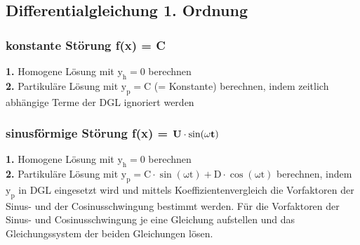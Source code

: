     \subsection{Differentialgleichung 1. Ordnung}
        \subsubsection{konstante Störung f(x) = C}
            \textbf{1.} Homogene Lösung mit $\mathrm{y_h = 0}$ berechnen\\
            \textbf{2.} Partikuläre Lösung mit $\mathrm{y_p = C}$ (= Konstante) berechnen, indem zeitlich abhängige Terme der DGL ignoriert werden
        \subsubsection{sinusförmige Störung f(x) = $\mathrm{\bf U \cdot \sin(\omega t)}$}
            \textbf{1.} Homogene Lösung mit $\mathrm{y_h = 0}$ berechnen\\
            \textbf{2.} Partikuläre Lösung mit $\mathrm{y_p = C \cdot \sin(\omega t) + D\cdot \cos(\omega t)}$ berechnen, indem $\mathrm{y_p}$ in DGL eingesetzt wird und mittels Koeffizientenvergleich die Vorfaktoren der Sinus- und der Cosinusschwingung bestimmt werden. Für die Vorfaktoren der Sinus- und Cosinusschwingung je eine Gleichung aufstellen und das Gleichungssystem der beiden Gleichungen lösen.